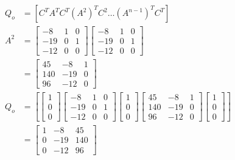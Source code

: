 \documentclass[main.tex]{subfiles}
\begin{document}
\begin{enumerate}
\begin{enumerate}
        $$
        \begin{aligned}
        Q_o &= \left[C^T A^T C^T\left(A^2\right)^T C^2 \ldots\left(A^{n-1}\right)^T C^T\right]\\
        A^2 &= \left[\begin{array}{lll}
        -8 & 1 & 0 \\
        -19 & 0 & 1 \\
        -12 & 0 & 0
        \end{array}\right] \left[\begin{array}{lll}
        -8 & 1 & 0 \\
        -19 & 0 & 1 \\
        -12 & 0 & 0
        \end{array}\right]\\
        & = \left[\begin{array}{ccc}
        45 & -8 & 1 \\
        140 & -19 & 0 \\
        96 & -12 & 0
        \end{array}\right] \\
        Q_o &= \left[ \left[\begin{array}{l}
        1 \\
        0 \\
        0
        \end{array}\right] \left[\begin{array}{lll}
        -8 & 1 & 0 \\
        -19 & 0 & 1 \\
        -12 & 0 & 0
        \end{array}\right] \left[\begin{array}{l}
        1 \\
        0 \\
        0
        \end{array}\right] \left[\begin{array}{ccc}
        45 & -8 & 1 \\
        140 & -19 & 0 \\
        96 & -12 & 0
        \end{array}\right] \left[\begin{array}{l}
        1 \\
        0 \\
        0
        \end{array}\right] \right] \\
        & = \left[\begin{array}{lll}
        1 & -8 & 45\\
        0 & -19 & 140 \\
        0 & -12 & 96
        \end{array} \right]
        \end{aligned}
        $$
        

\end{enumerate}
\end{enumerate}
\end{document}
